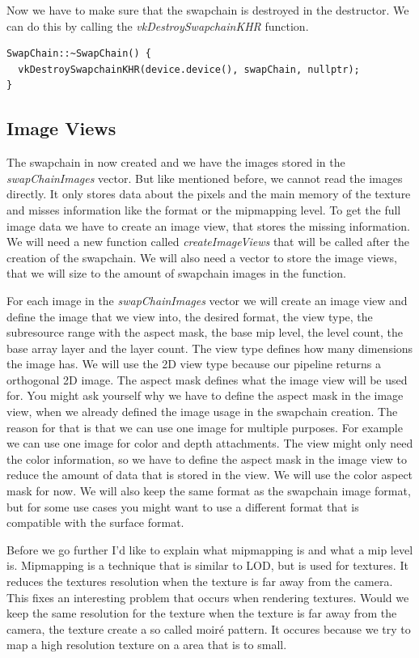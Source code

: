 \documentclass[12pt]{report} \usepackage{preamble}
\begin{document}
Now we have to make sure that the swapchain is destroyed in the destructor. We can do this by calling
the \textit{vkDestroySwapchainKHR} function.

\begin{lstlisting}[Language=C++]
SwapChain::~SwapChain() {
  vkDestroySwapchainKHR(device.device(), swapChain, nullptr);
}
\end{lstlisting}

\subsection{Image Views}

The swapchain in now created and we have the images stored in the \\
\textit{swapChainImages} vector. But like mentioned before,
we cannot read the images directly. It only stores data about the pixels and the main memory of the texture and misses
information like the format or the mipmapping level. To get the full image data we have to create an image view, that
stores the missing information. We will need a new function called \textit{createImageViews} that will be called after
the creation of the swapchain. We will also need a vector to store the image views, that we will size to the amount of
swapchain images in the function.

For each image in the \textit{swapChainImages} vector we will create an image view and define the image that we view
into, the desired format, the view type, the subresource range with the aspect mask, the base mip level, the level count,
the base array layer and the layer count. The view type defines how many dimensions the image has. We will use the 2D view
type because our pipeline returns a orthogonal 2D image. The aspect mask defines what the image view will be used for.
You might ask yourself why we have to define the aspect mask in the image view, when we already defined the image usage
in the swapchain creation. The reason for that is that we can use one image for multiple purposes. For example we can use
one image for color and depth attachments. The view might only need the color information, so we have to define the aspect
mask in the image view to reduce the amount of data that is stored in the view. We will use the color aspect mask for now.
We will also keep the same format as the swapchain image format, but for some use cases you might want to use a different
format that is compatible with the surface format.

Before we go further I'd like to explain what mipmapping is and what a mip level is. Mipmapping is a technique that
is similar to \ac{LOD}, but is used for textures. It reduces the textures resolution when the texture
is far away from the camera. This fixes an interesting problem that occurs when rendering textures. Would we keep the same
resolution for the texture when the texture is far away from the camera, the texture create a so called moiré pattern.
It occures because we try to map a high resolution texture on a area that is to small.
\end{document}
